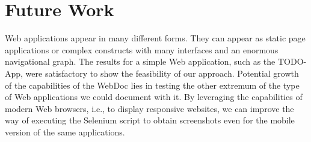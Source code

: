 \section{Future Work}\label{sec:futwork}

Web applications appear in many different forms. They can appear as static page applications or complex constructs with many interfaces and an enormous navigational graph. The results for a simple Web application, such as the TODO-App, were satisfactory to show the feasibility of our approach. Potential growth of the capabilities of the WebDoc lies in testing the other extremum of the type of Web applications we could document with it. By leveraging the capabilities of modern Web browsers, i.e., to display responsive websites, we can improve the way of executing the Selenium script to obtain screenshots even for the mobile version of the same applications.

